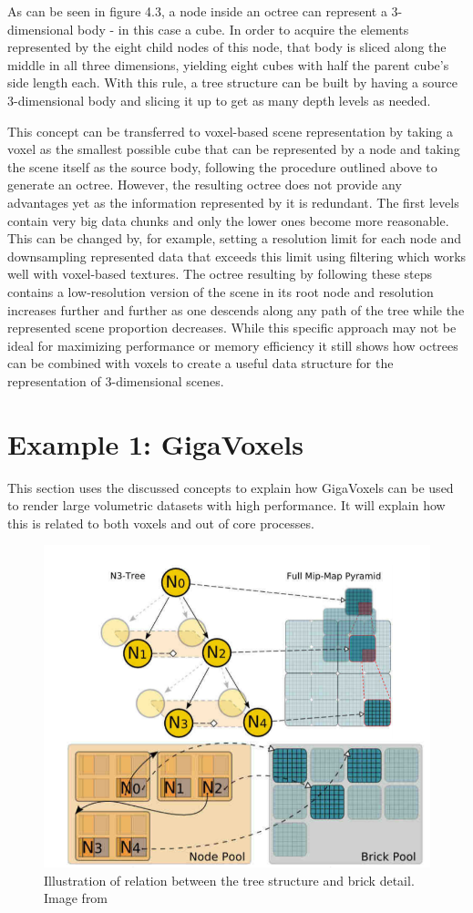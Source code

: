 As can be seen in figure 4.3, a node inside an octree can represent a 3-dimensional body - in this case a cube. In order to acquire the elements represented by the eight child nodes of this node, that body is sliced along the middle in all three dimensions, yielding eight cubes with half the parent cube's side length each. With this rule, a tree structure can be built by having a source 3-dimensional body and slicing it up to get as many depth levels as needed.

This concept can be transferred to voxel-based scene representation by taking a voxel as the smallest possible cube that can be represented by a node and taking the scene itself as the source body, following the procedure outlined above to generate an octree. However, the resulting octree does not provide any advantages yet as the information represented by it is redundant. The first levels contain very big data chunks and only the lower ones become more reasonable. This can be changed by, for example, setting a resolution limit for each node and downsampling represented data that exceeds this limit using filtering which works well with voxel-based textures. The octree resulting by following these steps contains a low-resolution version of the scene in its root node and resolution increases further and further as one descends along any path of the tree while the represented scene proportion decreases. While this specific approach may not be ideal for maximizing performance or memory efficiency it still shows how octrees can be combined with voxels to create a useful data structure for the representation of 3-dimensional scenes. 

\section{Example 1: GigaVoxels}

This section uses the discussed concepts to explain how GigaVoxels can be used to render large volumetric datasets with high performance. It will explain how this is related to both voxels and out of core processes.

\begin{figure}[h]
  \begin{center}
    \includegraphics[width=.4\textwidth]{logos/gigavoxels_structure.png}
    \caption{Illustration of relation between the tree structure and brick detail. Image from \cite{Crassin:2009:GRS:1507149.1507152}}
  \end{center}
\end{figure}

